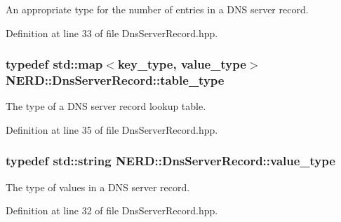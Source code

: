 \-An appropriate type for the number of entries in a \-D\-N\-S server record. 



\-Definition at line 33 of file \-Dns\-Server\-Record.\-hpp.

\hypertarget{classNERD_1_1DnsServerRecord_aeef40180a6b643af13b33122a73e8b0d}{
\subsubsection[{table\-\_\-type}]{\setlength{\rightskip}{0pt plus 5cm}typedef std\-::map$<${\bf key\-\_\-type}, {\bf value\-\_\-type}$>$ {\bf \-N\-E\-R\-D\-::\-Dns\-Server\-Record\-::table\-\_\-type}}}
\label{classNERD_1_1DnsServerRecord_aeef40180a6b643af13b33122a73e8b0d}


\-The type of a \-D\-N\-S server record lookup table. 



\-Definition at line 35 of file \-Dns\-Server\-Record.\-hpp.

\hypertarget{classNERD_1_1DnsServerRecord_aec809b0a9732f03885f5df5dd56f5f52}{
\subsubsection[{value\-\_\-type}]{\setlength{\rightskip}{0pt plus 5cm}typedef std\-::string {\bf \-N\-E\-R\-D\-::\-Dns\-Server\-Record\-::value\-\_\-type}}}
\label{classNERD_1_1DnsServerRecord_aec809b0a9732f03885f5df5dd56f5f52}


\-The type of values in a \-D\-N\-S server record. 



\-Definition at line 32 of file \-Dns\-Server\-Record.\-hpp.



